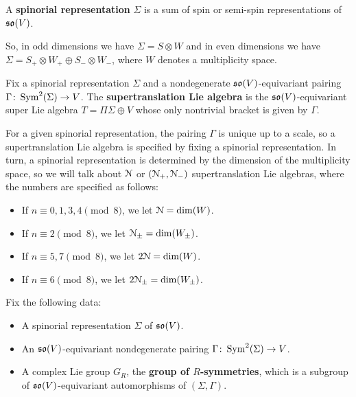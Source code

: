\documentclass[10pt, oneside]{article}
\begin{document}
\begin{dfn}
A {\bf spinorial representation} $\Sigma$ is a sum of spin or semi-spin representations of $\mathfrak{so}(V)$.
\end{dfn}

So, in odd dimensions we have $\Sigma=S\otimes W$ and in even dimensions we have $\Sigma=S_+\otimes W_+\oplus S_-\otimes W_-$, where $W$ denotes a multiplicity space.

\begin{dfn}
Fix a spinorial representation $\Sigma$ and a nondegenerate $\mathfrak{so}(V)$-equivariant pairing $\Gamma\colon \operatorname{Sym}^2(\Sigma)\rightarrow V$. The {\bf supertranslation Lie algebra} is the $\mathfrak{so}(V)$-equivariant super Lie algebra $T=\Pi\Sigma\oplus V$ whose only nontrivial bracket is given by $\Gamma$.
\end{dfn}

For a given spinorial representation, the pairing $\Gamma$ is unique up to a scale, so a supertranslation Lie algebra is specified by fixing a spinorial representation. In turn, a spinorial representation is determined by the dimension of the multiplicity space, so we will talk about $\mathcal{N}$ or $(\mathcal{N}_+, \mathcal{N}_-)$ supertranslation Lie algebras, where the numbers are specified as follows:
\begin{itemize}
\item If $n\equiv 0, 1, 3, 4\pmod 8$, we let $\mathcal{N} = \dim(W)$.

\item If $n\equiv 2 \pmod 8$, we let $\mathcal{N}_{\pm}=\dim(W_{\pm})$.

\item If $n\equiv 5, 7\pmod 8$, we let $2\mathcal{N} = \dim(W)$.

\item If $n\equiv 6\pmod 8$, we let $2\mathcal{N}_{\pm} = \dim(W_{\pm})$.
\end{itemize}

Fix the following data:
\begin{itemize}
\item A spinorial representation $\Sigma$ of $\mathfrak{so}(V)$.

\item An $\mathfrak{so}(V)$-equivariant nondegenerate pairing $\Gamma\colon \operatorname{Sym}^2(\Sigma)\rightarrow V$.

\item A complex Lie group $G_R$, the {\bf group of $R$-symmetries}, which is a subgroup of $\mathfrak{so}(V)$-equivariant automorphisms of $(\Sigma, \Gamma)$.
\end{itemize}
\end{document}
